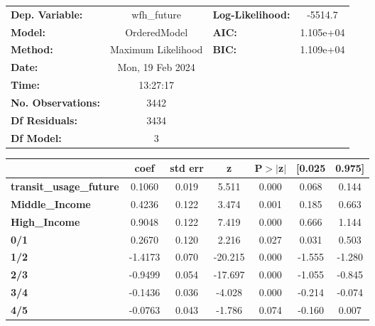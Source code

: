 \documentclass{report}
\begin{document}
\begin{center}
\begin{tabular}{lclc}
\toprule
\textbf{Dep. Variable:}         &    wfh\_future     & \textbf{  Log-Likelihood:    } &   -5514.7   \\
\textbf{Model:}                 &    OrderedModel    & \textbf{  AIC:               } & 1.105e+04   \\
\textbf{Method:}                & Maximum Likelihood & \textbf{  BIC:               } & 1.109e+04   \\
\textbf{Date:}                  &  Mon, 19 Feb 2024  & \textbf{                     } &             \\
\textbf{Time:}                  &      13:27:17      & \textbf{                     } &             \\
\textbf{No. Observations:}      &         3442       & \textbf{                     } &             \\
\textbf{Df Residuals:}          &         3434       & \textbf{                     } &             \\
\textbf{Df Model:}              &            3       & \textbf{                     } &             \\
\bottomrule
\end{tabular}
\begin{tabular}{lcccccc}
                                & \textbf{coef} & \textbf{std err} & \textbf{z} & \textbf{P$> |$z$|$} & \textbf{[0.025} & \textbf{0.975]}  \\
\midrule
\textbf{transit\_usage\_future} &       0.1060  &        0.019     &     5.511  &         0.000        &        0.068    &        0.144     \\
\textbf{Middle\_Income}         &       0.4236  &        0.122     &     3.474  &         0.001        &        0.185    &        0.663     \\
\textbf{High\_Income}           &       0.9048  &        0.122     &     7.419  &         0.000        &        0.666    &        1.144     \\
\textbf{0/1}                    &       0.2670  &        0.120     &     2.216  &         0.027        &        0.031    &        0.503     \\
\textbf{1/2}                    &      -1.4173  &        0.070     &   -20.215  &         0.000        &       -1.555    &       -1.280     \\
\textbf{2/3}                    &      -0.9499  &        0.054     &   -17.697  &         0.000        &       -1.055    &       -0.845     \\
\textbf{3/4}                    &      -0.1436  &        0.036     &    -4.028  &         0.000        &       -0.214    &       -0.074     \\
\textbf{4/5}                    &      -0.0763  &        0.043     &    -1.786  &         0.074        &       -0.160    &        0.007     \\
\bottomrule
\end{tabular}
\end{center}
\end{document}
